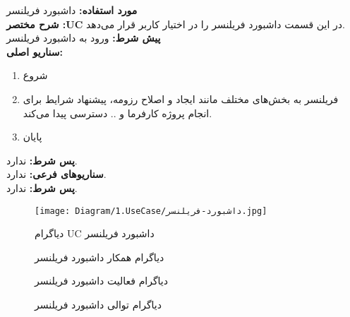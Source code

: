 \textbf{مورد استفاده:}
داشبورد فریلنسر
\\
\textbf{شرح مختصر :UC}
در این قسمت داشبورد فریلنسر را در اختیار کاربر قرار می‌دهد.
\\
\textbf{پيش شرط:}
ورود به داشبورد فریلنسر
\\
\textbf{سناريو اصلی:}
\begin{enumerate}
	\item
	شروع
	\item
	فریلنسر به بخش‌های مختلف مانند ایجاد و اصلاح رزومه، پیشنهاد شرایط برای انجام پروژه کارفرما و .. دسترسی پیدا می‌کند.
	\item
	پایان
\end{enumerate}

\noindent
\textbf{پس شرط:}
ندارد.
\\
\textbf{سناريوهای فرعی:}
ندارد.
\\
\textbf{پس شرط:}
ندارد.


\begin{figure}[H]
	\centering
	\texttt{[image: Diagram/1.UseCase/داشبورد-فریلنسر.jpg]}
	\caption{دیاگرام UC داشبورد فریلنسر}
	\label{fig:uc:داشبورد-فریلنسر}
\end{figure}
\begin{figure}[H]
	\centering
	\caption{دیاگرام همکار داشبورد فریلنسر}
	\label{fig:c:داشبورد-فریلنسر}
\end{figure}
\begin{figure}[H]
	\centering
	\caption{دیاگرام فعالیت داشبورد فریلنسر}
	\label{fig:a:داشبورد-فریلنسر}
\end{figure}
\begin{figure}[H]
	\centering
	\caption{دیاگرام توالی داشبورد فریلنسر}
	\label{fig:s:داشبورد-فریلنسر}
\end{figure}
